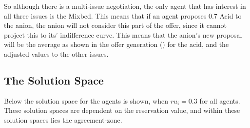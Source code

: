 So although there is a multi-issue negotiation, the only agent that has interest in all three issues is the Mixbed. This means that if an agent proposes 0.7 Acid to the anion, the anion will not consider this part of the offer, since it cannot project this to its' indifference curve. This means that the anion's new proposal will be the average as shown in the offer generation () for the acid, and the adjusted values to the other issues.
\clearpage
\subsection{The Solution Space}
Below the solution space for the agents is shown, when $ru_i = 0.3$ for all agents. These solution spaces are dependent on the reservation value, and within these solution spaces lies the agreement-zone.

